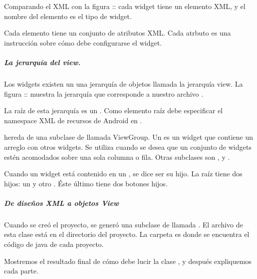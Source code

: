 Comparando el XML con la figura :: cada widget tiene un elemento XML, y el
nombre del elemento es el tipo de widget.

Cada elemento tiene un conjunto de atributos XML. Cada atrbuto es una instrucción
sobre cómo debe configurarse el widget.


\subparagraph{La jerarquía del view.}
\label{\detokenize{dev_docs:la-jerarquia-del-view}}
Los widgets existen un una jerarquía de objetos  llamada la jerarquía
view. La figura :: muestra la jerarquía que corresponde a nuestro archivo
.

La raíz de esta jerarquía es un . Como elemento raíz debe especificar
el namespace XML de recursos de Android en .

 hereda de una subclase de  llamada ViewGroup. Un  es un
widget que contiene un arreglo con otros widgets. Se utiliza  cuando
se desea que un conjunto de widgets estén acomodados sobre una sola columna
o fila. Otras subclases  son ,  y .

Cuando un widget está contenido en un , se dice ser su hijo. La raíz
 tiene dos hijos: un  y otro . Éste último
tiene dos botones hijos.


\subparagraph{De diseños XML a objetos View}
\label{\detokenize{dev_docs:de-disenos-xml-a-objetos-view}}
Cuando se creó el proyecto, se generó una subclase de  llamada
. El archivo de esta clase está en el directorio  del
proyecto. La carpeta  es donde se encuentra el código de java de cada
proyecto.

Mostremos el resultado final de cómo debe lucir la clase ,
y después expliquemos cada parte.

